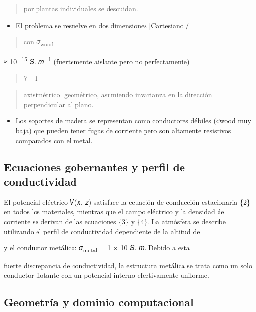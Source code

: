 \documentclass[
]{article}
\providecommand{\tightlist}{%
  \setlength{\itemsep}{0pt}\setlength{\parskip}{0pt}}
\begin{document}
\begin{quote}
por plantas individuales se descuidan.
\end{quote}

\begin{itemize}
\tightlist
\item
  El problema se resuelve en dos dimensiones {[}Cartesiano /
\end{itemize}

\begin{quote}
con 𝜎\textsubscript{wood}
\end{quote}

≈ 10\textsuperscript{−15} 𝑆. 𝑚\textsuperscript{−1} (fuertemente aislante
pero no perfectamente)

\begin{quote}
7 −1
\end{quote}

\begin{quote}
axisimétrico{]} geométrico, asumiendo invarianza en la dirección
perpendicular al plano.
\end{quote}

\begin{itemize}
\tightlist
\item
  Los soportes de madera se representan como conductores débiles (σwood
  muy baja) que pueden tener fugas de corriente pero son altamente
  resistivos comparados con el metal.
\end{itemize}

\subsection{Ecuaciones gobernantes y perfil de
conductividad}\label{ecuaciones-gobernantes-y-perfil-de-conductividad}

El potencial eléctrico 𝑉(𝑥, 𝑧) satisface la ecuación de conducción
estacionaria \{2\} en todos los materiales, mientras que el campo
eléctrico y la densidad de corriente se derivan de las ecuaciones \{3\}
y \{4\}. La atmósfera se describe utilizando el perfil de conductividad
dependiente de la altitud de

y el conductor metálico: 𝜎\textsubscript{metal} = 1 × 10 𝑆. 𝑚. Debido a
esta

fuerte discrepancia de conductividad, la estructura metálica se trata
como un solo conductor flotante con un potencial interno efectivamente
uniforme.

\subsection{Geometría y dominio
computacional}\label{geometruxeda-y-dominio-computacional}
\end{document}
